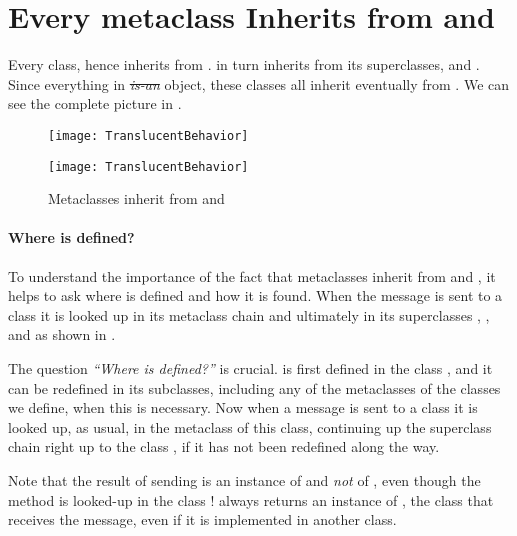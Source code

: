 \documentclass[a4paper,10pt,twoside]{book}
\begin{document}
\section{Every metaclass Inherits from  and }

Every   class, hence inherits from .
 in turn inherits from its superclasses,  and .
Since everything in \st \emph{is-an} object, these classes all inherit eventually from .
We can see the complete picture in .

\begin{center}
\begin{figure}
\ifluluelse
	{\centerline{\texttt{[image: TranslucentBehavior]}}}
	{\centerline{\texttt{[image: TranslucentBehavior]}}}
\caption{Metaclasses inherit from  and \label{fig:inheritbehavior}}
\end{figure}
\end{center}

\paragraph{Where is  defined?}
To understand the importance of the fact that metaclasses inherit from  and , it helps to ask where  is defined and how it is found.
When the message  is sent to a class it is looked up in its metaclass chain and ultimately in its superclasses , , and  as shown in .

The question \emph{``Where  is defined?''} is crucial.
 is first defined in the class , and it can be redefined in its subclasses, including any of the metaclasses of the classes we define, when this is necessary.
Now when a message  is sent to a class it is looked up, as usual, in the metaclass of this class, continuing up the superclass chain right up to the class , if it has not been redefined along the way.

Note that the result of sending  is an instance of  and \emph{not} of , even though the method is looked-up in the class !
 always returns an instance of \self, the class that receives the message, even if it is implemented in another class.
\end{document}
